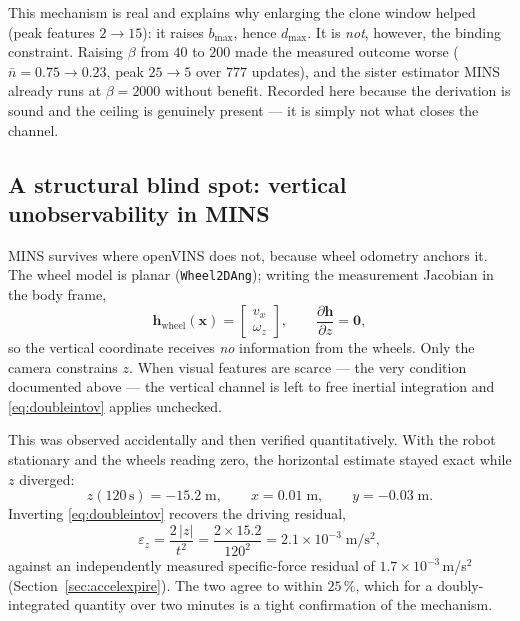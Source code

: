 This mechanism is real and explains why enlarging the clone window helped
(peak features $2 \to 15$): it raises $b_{\max}$, hence $d_{\max}$. It is
\emph{not}, however, the binding constraint. Raising $\beta$ from $40$ to
$200$ made the measured outcome worse ($\bar{n}=0.75 \to 0.23$, peak
$25 \to 5$ over $777$ updates), and the sister estimator MINS already runs at
$\beta = 2000$ without benefit. Recorded here because the derivation is sound
and the ceiling is genuinely present --- it is simply not what closes the
channel.

\subsection{A structural blind spot: vertical unobservability in MINS}
\label{sec:minsz}

MINS survives where openVINS does not, because wheel odometry anchors it. The
wheel model is planar (\texttt{Wheel2DAng}); writing the measurement Jacobian
in the body frame,
\begin{equation}
\mathbf{h}_{\mathrm{wheel}}(\mathbf{x}) =
\begin{bmatrix} v_x \\ \omega_z \end{bmatrix},
\qquad
\frac{\partial \mathbf{h}}{\partial z} = \mathbf{0},
\label{eq:wheeljac}
\end{equation}
so the vertical coordinate receives \emph{no} information from the wheels.
Only the camera constrains $z$. When visual features are scarce --- the very
condition documented above --- the vertical channel is left to free inertial
integration and \eqref{eq:doubleintov} applies unchecked.

This was observed accidentally and then verified quantitatively. With the
robot stationary and the wheels reading zero, the horizontal estimate stayed
exact while $z$ diverged:
\begin{equation}
z(120\,\mathrm{s}) = -15.2\;\mathrm{m},
\qquad
x = 0.01\;\mathrm{m},
\qquad
y = -0.03\;\mathrm{m}.
\label{eq:minszdrift}
\end{equation}
Inverting \eqref{eq:doubleintov} recovers the driving residual,
\begin{equation}
\varepsilon_z = \frac{2\,|z|}{t^{2}}
              = \frac{2 \times 15.2}{120^{2}}
              = 2.1\times10^{-3}\;\mathrm{m/s^2},
\label{eq:epsz}
\end{equation}
against an independently measured specific-force residual of
$1.7\times10^{-3}$\,m/s$^2$ (Section~\ref{sec:accelexpire}). The two agree to
within $25\,\%$, which for a doubly-integrated quantity over two minutes is a
tight confirmation of the mechanism.

